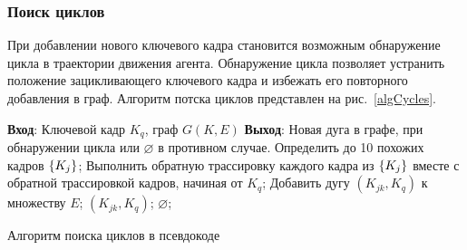 \subsubsection{Поиск циклов}
При добавлении нового ключевого кадра становится возможным обнаружение цикла в траектории движения агента. Обнаружение цикла позволяет устранить положение зацикливающего ключевого кадра и избежать его повторного добавления в граф. Алгоритм потска циклов представлен на рис.~\ref{algCycles}.


\begin{algorithm}[H]
        \begin{algorithmic}[1]
            \State \textbf{Вход}: Ключевой кадр $K_q$, граф $G(K, E)$
            \State \textbf{Выход}: Новая дуга в графе, при обнаружении цикла или $\varnothing$ в противном случае.
                \State Определить до 10 похожих кадров $\{ K_j \}$;
                \State Выполнить обратную трассировку каждого кадра из $\{ K_j \}$ вместе с обратной трассировкой кадров, начиная от $K_q$;
                    \State Добавить дугу $(K_{jk}, K_q)$ к множеству $E$;
                    \State \Return $(K_{jk}, K_q)$;
                \EndIf
            \EndFor
            \State \Return $\varnothing$;
        \end{algorithmic}
    \caption{Алгоритм поиска циклов в псевдокоде}
    \label{algCycles}
\end{algorithm}


